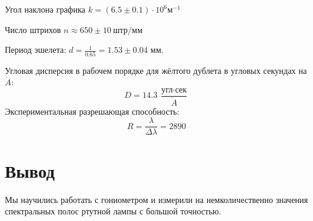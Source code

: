 \documentclass[a4paper,12pt]{article}
\begin{document}
Угол наклона графика $k = (6.5 \pm 0.1)\cdot 10^6 \text{м}^{-1}$

Число штрихов $n \approx 650 \pm 10\ \text{штр}/\text{мм}$

Период эшелета: $d = \frac{1}{0.65} = 1.53 \pm 0.04$ мм.

Угловая дисперсия в рабочем порядке для жёлтого дублета в угловых секундах на $\dot A$:
\[
D = 14.3\ \frac{\text{угл} \cdot \text{сек}}{\dot A}
\]
Экспериментальная разрешающая способность:
\[
R = \frac{\lambda}{\Delta \lambda} = 2890
\]

\section*{Вывод}
Мы научились работать с гониометром и измерили на немколичественно значения спектральных полос ртутной лампы с большой точностью.
\end{document}
